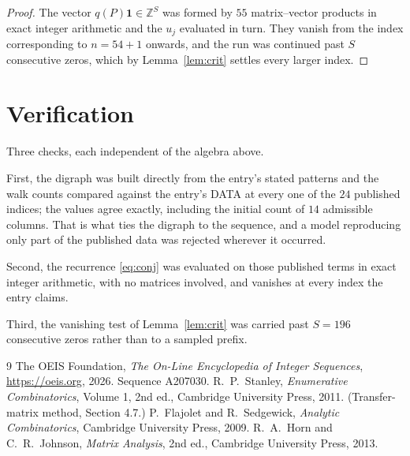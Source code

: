\documentclass[11pt,a4paper]{article}
\theoremstyle{plain}
\theoremstyle{definition}
\begin{document}
\begin{proof}
The vector $q(P)\mathbf{1}\in\mathbb{Z}^{S}$ was formed by $55$ matrix--vector
products in exact integer arithmetic and the $u_j$ evaluated in turn. They vanish from the
index corresponding to $n=54+1$ onwards, and the run was continued past $S$ consecutive
zeros, which by Lemma~\ref{lem:crit} settles every larger index.
\end{proof}

\section{Verification}

Three checks, each independent of the algebra above.

First, the digraph was built directly from the entry's stated patterns and the walk counts
compared against the entry's DATA at every one of the $24$ published indices; the
values agree exactly, including the initial count of $14$ admissible columns. That is
what ties the digraph to the sequence, and a model reproducing only part of the published
data was rejected wherever it occurred.

Second, the recurrence \eqref{eq:conj} was evaluated on those published terms in exact
integer arithmetic, with no matrices involved, and vanishes at every index the entry claims.

Third, the vanishing test of Lemma~\ref{lem:crit} was carried past $S=196$ consecutive
zeros rather than to a sampled prefix.

\begin{thebibliography}{9}
 The OEIS Foundation, \emph{The On-Line Encyclopedia of Integer
Sequences}, \url{https://oeis.org}, 2026. Sequence A207030.
 R.~P.~Stanley, \emph{Enumerative Combinatorics}, Volume 1, 2nd ed.,
Cambridge University Press, 2011. (Transfer-matrix method, Section 4.7.)
 P.~Flajolet and R.~Sedgewick, \emph{Analytic Combinatorics}, Cambridge
University Press, 2009.
 R.~A.~Horn and C.~R.~Johnson, \emph{Matrix Analysis}, 2nd ed., Cambridge
University Press, 2013.
\end{thebibliography}
\end{document}
